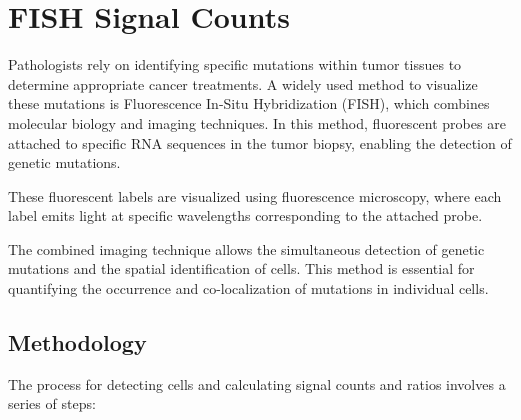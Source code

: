 \documentclass[a4paper,12pt]{article}
\begin{document}
\section{FISH Signal Counts}


Pathologists rely on identifying specific mutations within tumor tissues to determine appropriate cancer treatments. A widely used method to visualize these mutations is Fluorescence In-Situ Hybridization (FISH), which combines molecular biology and imaging techniques. In this method, fluorescent probes are attached to specific RNA sequences in the tumor biopsy, enabling the detection of genetic mutations.

These fluorescent labels are visualized using fluorescence microscopy, where each label emits light at specific wavelengths corresponding to the attached probe.

The combined imaging technique allows the simultaneous detection of genetic mutations and the spatial identification of cells. This method is essential for quantifying the occurrence and co-localization of mutations in individual cells.

\subsection{Methodology}

The process for detecting cells and calculating signal counts and ratios involves a series of steps:
\end{document}
